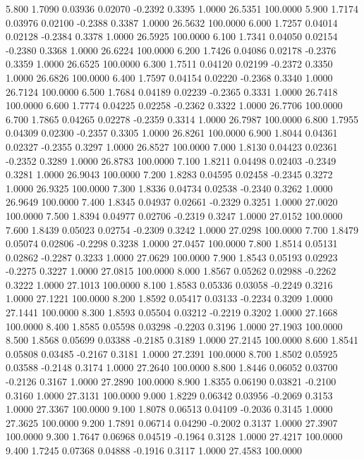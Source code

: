    5.800   1.7090   0.03936   0.02070  -0.2392   0.3395   1.0000  26.5351 100.0000
   5.900   1.7174   0.03976   0.02100  -0.2388   0.3387   1.0000  26.5632 100.0000
   6.000   1.7257   0.04014   0.02128  -0.2384   0.3378   1.0000  26.5925 100.0000
   6.100   1.7341   0.04050   0.02154  -0.2380   0.3368   1.0000  26.6224 100.0000
   6.200   1.7426   0.04086   0.02178  -0.2376   0.3359   1.0000  26.6525 100.0000
   6.300   1.7511   0.04120   0.02199  -0.2372   0.3350   1.0000  26.6826 100.0000
   6.400   1.7597   0.04154   0.02220  -0.2368   0.3340   1.0000  26.7124 100.0000
   6.500   1.7684   0.04189   0.02239  -0.2365   0.3331   1.0000  26.7418 100.0000
   6.600   1.7774   0.04225   0.02258  -0.2362   0.3322   1.0000  26.7706 100.0000
   6.700   1.7865   0.04265   0.02278  -0.2359   0.3314   1.0000  26.7987 100.0000
   6.800   1.7955   0.04309   0.02300  -0.2357   0.3305   1.0000  26.8261 100.0000
   6.900   1.8044   0.04361   0.02327  -0.2355   0.3297   1.0000  26.8527 100.0000
   7.000   1.8130   0.04423   0.02361  -0.2352   0.3289   1.0000  26.8783 100.0000
   7.100   1.8211   0.04498   0.02403  -0.2349   0.3281   1.0000  26.9043 100.0000
   7.200   1.8283   0.04595   0.02458  -0.2345   0.3272   1.0000  26.9325 100.0000
   7.300   1.8336   0.04734   0.02538  -0.2340   0.3262   1.0000  26.9649 100.0000
   7.400   1.8345   0.04937   0.02661  -0.2329   0.3251   1.0000  27.0020 100.0000
   7.500   1.8394   0.04977   0.02706  -0.2319   0.3247   1.0000  27.0152 100.0000
   7.600   1.8439   0.05023   0.02754  -0.2309   0.3242   1.0000  27.0298 100.0000
   7.700   1.8479   0.05074   0.02806  -0.2298   0.3238   1.0000  27.0457 100.0000
   7.800   1.8514   0.05131   0.02862  -0.2287   0.3233   1.0000  27.0629 100.0000
   7.900   1.8543   0.05193   0.02923  -0.2275   0.3227   1.0000  27.0815 100.0000
   8.000   1.8567   0.05262   0.02988  -0.2262   0.3222   1.0000  27.1013 100.0000
   8.100   1.8583   0.05336   0.03058  -0.2249   0.3216   1.0000  27.1221 100.0000
   8.200   1.8592   0.05417   0.03133  -0.2234   0.3209   1.0000  27.1441 100.0000
   8.300   1.8593   0.05504   0.03212  -0.2219   0.3202   1.0000  27.1668 100.0000
   8.400   1.8585   0.05598   0.03298  -0.2203   0.3196   1.0000  27.1903 100.0000
   8.500   1.8568   0.05699   0.03388  -0.2185   0.3189   1.0000  27.2145 100.0000
   8.600   1.8541   0.05808   0.03485  -0.2167   0.3181   1.0000  27.2391 100.0000
   8.700   1.8502   0.05925   0.03588  -0.2148   0.3174   1.0000  27.2640 100.0000
   8.800   1.8446   0.06052   0.03700  -0.2126   0.3167   1.0000  27.2890 100.0000
   8.900   1.8355   0.06190   0.03821  -0.2100   0.3160   1.0000  27.3131 100.0000
   9.000   1.8229   0.06342   0.03956  -0.2069   0.3153   1.0000  27.3367 100.0000
   9.100   1.8078   0.06513   0.04109  -0.2036   0.3145   1.0000  27.3625 100.0000
   9.200   1.7891   0.06714   0.04290  -0.2002   0.3137   1.0000  27.3907 100.0000
   9.300   1.7647   0.06968   0.04519  -0.1964   0.3128   1.0000  27.4217 100.0000
   9.400   1.7245   0.07368   0.04888  -0.1916   0.3117   1.0000  27.4583 100.0000
